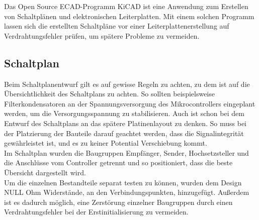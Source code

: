 
Das Open Source ECAD-Programm KiCAD ist eine Anwendung zum Erstellen von Schaltplänen und elektronischen Leiterplatten. Mit einem solchen Programm lassen sich die erstellten Schaltpläne vor einer Leiterplattenerstellung auf Verdrahtungsfehler prüfen, um spätere Probleme zu vermeiden.

\subsection{Schaltplan}
Beim Schaltplanentwurf gilt es auf gewisse Regeln zu achten, zu dem ist auf die Übersichtlichkeit des Schaltplans zu achten.
So sollten beispielsweise Filterkondensatoren an der Spannungsversorgung des Mikrocontrollers eingeplant werden, um die Versorgungsspannung zu stabilisieren. Auch ist schon bei dem Entwurf des Schaltplans an das spätere Platinenlayout zu denken. So muss bei der Platzierung der Bauteile darauf geachtet werden, dass die Signalintegrität gewährleistet ist, und es zu keiner Potential Verschiebung kommt.\\
Im Schaltplan wurden die Baugruppen Empfänger, Sender, Hochsetzsteller und die Anschlüsse vom Controller getrennt und so positioniert, dass die beste Übersicht dargestellt wird.\\
Um die einzelnen Bestandteile separat testen zu können, wurden dem Design NULL Ohm Widerstände, an den Verbindungspunkten, hinzugefügt. Außerdem ist es dadurch möglich, eine Zerstörung einzelner Baugruppen durch einen Verdrahtungsfehler bei der Erstinitialisierung zu vermeiden.\\   

